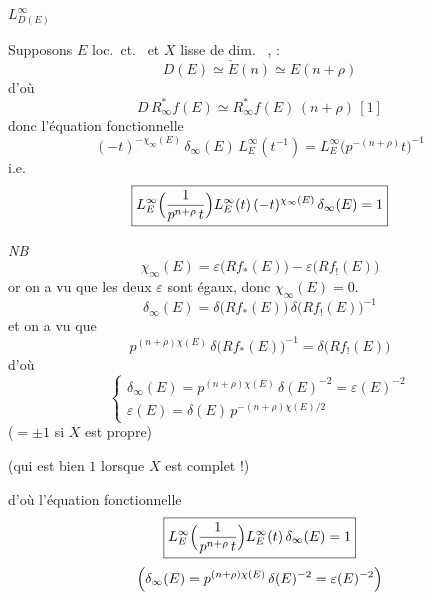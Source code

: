 \documentclass[11pt,a4paper]{article}
\begin{document}
$L^{\infty}_{D(E)}$ 

Supposons $E$ loc.\ ct.\  et $X$ lisse de dim.\ \ill{}
\ill{}, \ill{} \ill{} \ill{} :
\[
  D(E) \simeq \check E(n) \simeq E(n + \rho)
\]
d'où
\[
  \boxed{D\, R^{*}_{\infty} f(E) \simeq R^{*}_{\infty} f(E)\,(n + \rho)\,[1]}
\]
donc \ill{} l'équation fonctionnelle
\[
  (-t)^{-\chi_{\infty}(E)}\, \delta_{\infty}(E)\, L^{\infty}_E(t^{-1})
  = L^{\infty}_E\bigl(p^{-(n+\rho)} t\bigr)^{-1}
\]
i.e.
\[
  \boxed{L^{\infty}_E\Bigl(\frac{1}{p^{n+\rho}\, t}\Bigr) L^{\infty}_E(t)\,
    (-t)^{\chi_{\infty}(E)}\, \delta_{\infty}(E) = 1}
\]

\emph{NB}
\[
  \chi_{\infty}(E) = \varepsilon\bigl(R f_{*}(E)\bigr) - \varepsilon\bigl(R f_{!}(E)\bigr)
\]
or on a vu que les deux $\varepsilon$ sont égaux, donc
$\chi_{\infty}(E) = 0$. 
\[
  \delta_{\infty}(E) = \delta\bigl(R f_{*}(E)\bigr)\, \delta\bigl(R f_{!}(E)\bigr)^{-1}
\]
et on a vu que
\[
  p^{(n+\rho)\chi(E)}\, \delta\bigl(R f_{*}(E)\bigr)^{-1} = \delta\bigl(R f_{!}(E)\bigr)
\]
d'où
\[
  \left\lbrace
  \begin{array}{l}
    \delta_{\infty}(E) = p^{(n+\rho)\chi(E)}\, \delta(E)^{-2} = \varepsilon(E)^{-2} \\[6pt]
    \varepsilon(E) = \delta(E)\, p^{-(n+\rho)\chi(E)/2}
  \end{array}
  \right.
\]
($= \pm 1$ si $X$ est \struck{\ill{}} propre)

(qui est bien $1$ lorsque $X$ est complet !)

d'où l'équation fonctionnelle
\[
  \boxed{L^{\infty}_E\Bigl(\frac{1}{p^{n+\rho}\, t}\Bigr) L^{\infty}_E(t)\,
    \delta_{\infty}(E) = 1}
\]
\[
  \Bigl(\delta_{\infty}(E) = p^{(n+\rho)\chi(E)}\, \delta(E)^{-2} = \varepsilon(E)^{-2}\Bigr)
\]
\end{document}

